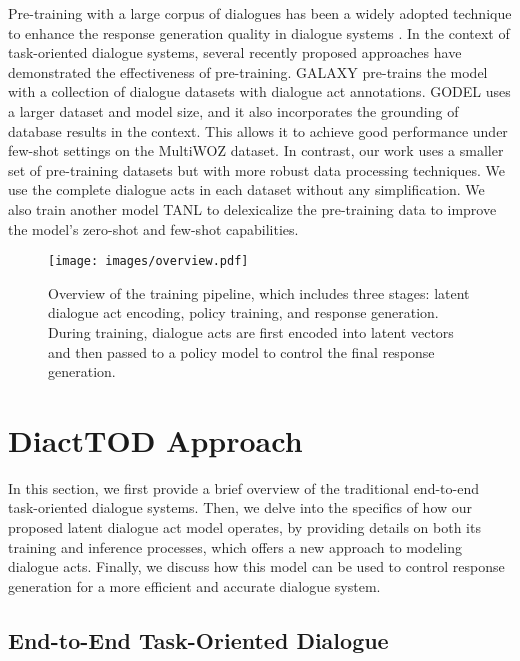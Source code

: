 Pre-training with a large corpus of dialogues has been a widely adopted technique to enhance the response generation quality in dialogue systems  \cite{DBLP:conf/acl/ZhangSGCBGGLD20,DBLP:conf/eacl/RollerDGJWLXOSB21}. 
In the context of task-oriented dialogue systems, several recently proposed approaches have demonstrated the effectiveness of pre-training.
GALAXY \cite{he2022galaxy} pre-trains the model with a collection of dialogue datasets with dialogue act annotations.
GODEL \cite{Peng2022GODELLP} uses a larger dataset and model size, and it also incorporates the grounding of database results in the context.
This allows it to achieve good performance under few-shot settings on the MultiWOZ dataset.
In contrast, our work uses a smaller set of pre-training datasets but with more robust data processing techniques.
We use the complete dialogue acts in each dataset without any simplification. 
We also train another model TANL \cite{DBLP:conf/iclr/PaoliniAKMAASXS21} to delexicalize the pre-training data to improve the model's zero-shot and few-shot capabilities. 

\begin{figure*}[t]
    \centering
    \texttt{[image: images/overview.pdf]}
    \caption{Overview of the training pipeline, which includes three stages: latent dialogue act encoding, policy training, and response generation.
    During training, dialogue acts are first encoded into latent vectors and then passed to a policy model to control the final response generation.}
    \label{fig:overview}
\end{figure*}

\section{DiactTOD Approach}

In this section, we first provide a brief overview of the traditional end-to-end task-oriented dialogue systems. 
Then, we delve into the specifics of how our proposed latent dialogue act model operates, by providing details on both its training and inference processes, which offers a new approach to modeling dialogue acts.
Finally, we discuss how this model can be used to control response generation for a more efficient and accurate dialogue system.

\subsection{End-to-End Task-Oriented Dialogue}

